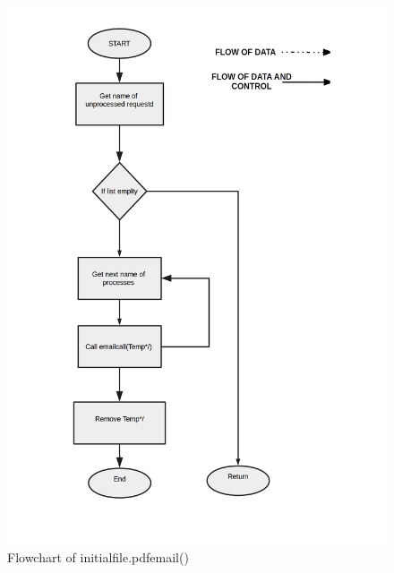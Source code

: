 \begin{figure}[H]
\centering \includegraphics[scale=0.27]{images/flowchartm.png}
\caption{Flowchart of initialfile.pdfemail()}
\label{fig:FD}
\end{figure}

